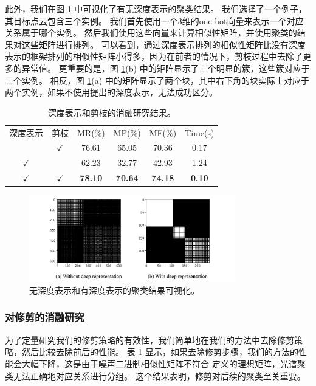 此外，我们在图 \ref{fig:spectral} 中可视化了有无深度表示的聚类结果。
我们选择了一个例子，其目标点云包含三个实例。
我们首先使用一个3维的one-hot向量来表示一个对应关系属于哪个实例。
然后我们使用这些向量来计算相似性矩阵，并使用聚类的结果对这些矩阵进行排列。
可以看到，通过深度表示排列的相似性矩阵比没有深度表示的框架排列的相似性矩阵小得多，因为在前者的情况下，剪枝过程中去除了更多的异常值。
更重要的是，图 \ref{fig:spectral}(b) 中的矩阵显示了三个明显的簇，这些簇对应于三个实例。
相反，图 \ref{fig:spectral}(a) 中的矩阵显示了两个块，其中右下角的块实际上对应于两个实例，如果不使用提出的深度表示，无法成功区分。

\setlength{\tabcolsep}{2pt}
\begin{table}
  \caption{
    深度表示和剪枝的消融研究结果。
    }
  \centering
  \begin{tabular}{cccccc}
    \hline\noalign{\smallskip}
    深度表示 & 剪枝 & MR(\%)         & MP(\%)         & MF(\%)         & Time(s)       \\
  \noalign{\smallskip}
  \hline
  \noalign{\smallskip}
  & $\checkmark$       & 76.61          & 65.05          & 70.36          & 0.17          \\
  $\checkmark$                   &         & 62.23          & 32.77          & 42.93          & 1.24          \\
  $\checkmark$                &
 $\checkmark$     & \textbf{78.10} & \textbf{70.64} & \textbf{74.18} & \textbf{0.10}\\
  \hline
  \end{tabular}
  \label{tab:ablation}
\end{table}
\setlength{\tabcolsep}{1.4pt}


\begin{figure}
  \centering
  \includegraphics[width=0.8\textwidth]{images/spectral.pdf}
  \caption{
    无深度表示和有深度表示的聚类结果可视化。
    }
  \label{fig:spectral}
\end{figure}

\subsubsection{对修剪的消融研究}为了定量研究我们的修剪策略的有效性，我们简单地在我们的方法中去除修剪策略，然后比较去除前后的性能。
表 \ref{tab:ablation} 显示，如果去除修剪步骤，我们的方法的性能会大幅下降，这是由于噪声二进制相似性矩阵不符合 \cite{li2007noise} 定义的理想矩阵，光谱聚类无法正确地对应关系进行分组。
这个结果表明，修剪对后续的聚类至关重要。

